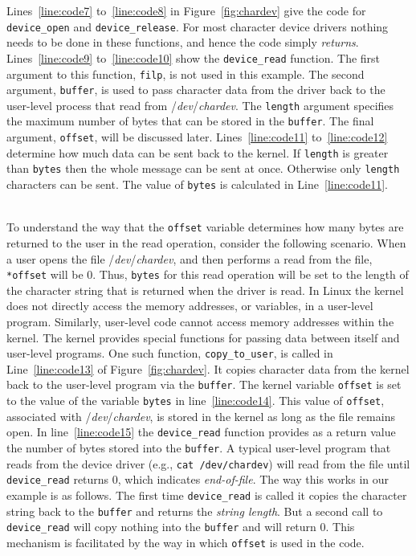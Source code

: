 \documentclass[epsfig,10pt,fullpage]{article}
\begin{document}
\noindent
Lines~\ref{line:code7} to~\ref{line:code8} in Figure~\ref{fig:chardev}
give the code for \texttt{device\_open} and
\texttt{device\_release}. For most character device drivers nothing needs to be done in these
functions, and hence the code simply {\it returns}.
Lines~\ref{line:code9} to~\ref{line:code10} show the \texttt{device\_read} function. The
first argument to this function, \texttt{filp}, is not used in this example. The second argument,
\texttt{buffer}, is used to pass character data from the driver back to the 
user-level process that read from /{\it dev}/{\it chardev}.
The \texttt{length} argument specifies the maximum number of bytes that can be stored 
in the \texttt{buffer}. The final argument, \texttt{offset}, will be discussed later. 
Lines~\ref{line:code11} to~\ref{line:code12} determine how much data can be sent back to
the kernel. If \texttt{length} is greater than \texttt{bytes} then the whole message can
be sent at once. Otherwise only \texttt{length} characters can be sent. The value of
\texttt{bytes} is calculated in Line~\ref{line:code11}. 

~\\
\noindent
To understand the way that the \texttt{offset} variable determines how many bytes are
returned to the user in the read operation, consider the following scenario. 
When a user opens the file /{\it dev}/{\it chardev}, and then performs a read from the 
file, \texttt{*offset} will be 0. Thus, \texttt{bytes} for this read operation will be set 
to the length of the character string that is returned when the driver is read.
In Linux the kernel does not directly access the memory addresses, or variables, in
a user-level program. Similarly, user-level code cannot access memory addresses within
the kernel. The kernel provides special functions for passing data between 
itself and user-level programs. One such function, \texttt{copy\_to\_user},
is called in Line~\ref{line:code13} of Figure~\ref{fig:chardev}. It copies character data
from the kernel back to the user-level program via the \texttt{buffer}. The kernel variable
\texttt{offset} is set to the value of the variable \texttt{bytes} in 
line~\ref{line:code14}. This value of \texttt{offset},
associated with /{\it dev}/{\it chardev}, is stored in the kernel as long as the file
remains open. In line~\ref{line:code15} the \texttt{device\_read} function provides 
as a return value the number of bytes stored into the \texttt{buffer}. A typical
user-level program that reads from the device driver (e.g., \texttt{cat /dev/chardev})
will read from the file until \texttt{device\_read} returns 0, which indicates {\it
end-of-file}. The way this works in our example is as follows. The first time
\texttt{device\_read} is called it copies the character string back to the
\texttt{buffer} and returns the {\it string length}. But a second call to 
\texttt{device\_read} will copy nothing into the \texttt{buffer} and will return 0. This
mechanism is facilitated by the way in which \texttt{offset} is used in the code.
\end{document}
